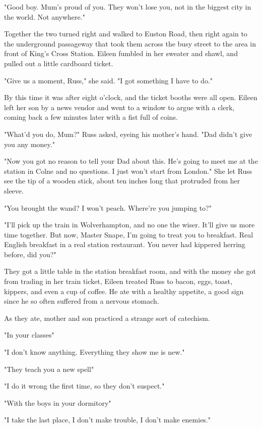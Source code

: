 "Good boy. Mum's proud of you. They won't lose you, not in the biggest city in the world. Not anywhere."

Together the two turned right and walked to Euston Road, then right again to the underground passageway that took them across the busy street to the area in front of King's Cross Station. Eileen fumbled in her sweater and shawl, and pulled out a little cardboard ticket.

"Give us a moment, Russ," she said. "I got something I have to do."

By this time it was after eight o'clock, and the ticket booths were all open. Eileen left her son by a news vendor and went to a window to argue with a clerk, coming back a few minutes later with a fist full of coins.

"What'd you do, Mum?" Russ asked, eyeing his mother's hand. "Dad didn't give you any money."

"Now you got no reason to tell your Dad about this. He's going to meet me at the station in Colne and no questions. I just won't start from London." She let Russ see the tip of a wooden stick, about ten inches long that protruded from her sleeve.

"You brought the wand? I won't peach. Where're you jumping to?"

"I'll pick up the train in Wolverhampton, and no one the wiser. It'll give us more time together. But now, Master Snape, I'm going to treat you to breakfast. Real English breakfast in a real station restaurant. You never had kippered herring before, did you?"

They got a little table in the station breakfast room, and with the money she got from trading in her train ticket, Eileen treated Russ to bacon, eggs, toast, kippers, and even a cup of coffee. He ate with a healthy appetite, a good sign since he so often suffered from a nervous stomach.

As they ate, mother and son practiced a strange sort of catechism.

"In your classes{\el}"

"I don't know anything. Everything they show me is new."

"They teach you a new spell{\el}"

"I do it wrong the first time, so they don't suspect."

"With the boys in your dormitory{\el}"

"I take the last place, I don't make trouble, I don't make enemies."

